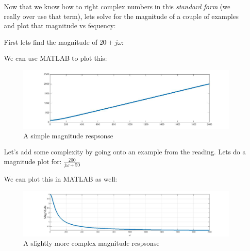 \documentclass{handout}
\begin{document}

Now that we know how to right complex numbers in this {\em standard form} (we really over use that term), lets solve for the magnitude of a couple of examples and plot that magnitude vs fequency:

First lets find the magnitude of $20+j\omega$:
\soln{1.5in}{
\[
|100 + j\omega|=\sqrt{100^2+\omega^2} = \sqrt{10,000 +\omega^2}
\]
}

We can use MATLAB to plot this:
\begin{figure} [h!]
\centering
\includegraphics[width=1\textwidth]{MagResponse1.jpg}
\caption{A simple magnitude respsonse}
\label{fig: MagResponse1}
\end{figure}

\newpage
\clearpage
\pagebreak

Let's add some complexity by going onto an example from the reading.  Lets do a magnitude plot for: $\frac{200}{j\omega +50}$

We can plot this in MATLAB as well:

\begin{figure} [h!]
\centering
\includegraphics[width=1\textwidth]{MagResponse2.jpg}
\caption{A slightly more complex magnitude respsonse}
\label{fig: MagResponse2}
\end{figure}
\end{document}
